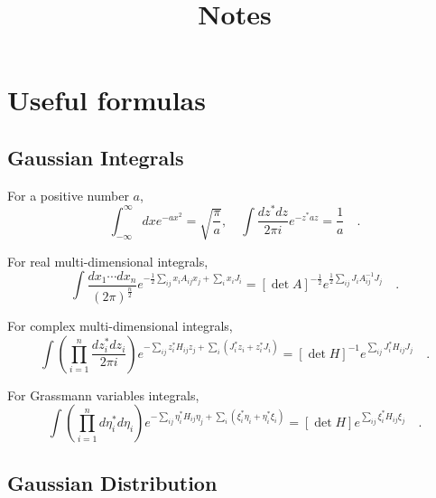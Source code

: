 \documentclass{book}
\title{Notes}
\date{}
\numberwithin{equation}{section}
\begin{document}
\tableofcontents

\chapter{Useful formulas}
\section{Gaussian Integrals}
For a positive number $a$,
\begin{equation}
  \int_{-\infty}^\infty dx e^{-ax^2}=\sqrt{\frac{\pi}{a}},\quad
  \int\frac{dz^*dz}{2\pi i}e^{-z^*az}=\frac{1}{a}\quad.
\end{equation}

For real multi-dimensional integrals,
\begin{equation}
  \int\frac{dx_1\cdots dx_n}{(2\pi)^{\frac{n}{2}}}
  e^{-\frac{1}{2}\sum_{ij}x_iA_{ij}x_j+\sum_ix_iJ_i}=
  [\det A]^{-\frac{1}{2}}e^{\frac{1}{2}\sum_{ij}J_iA^{-1}_{ij}J_j}\quad.
\end{equation}

For complex multi-dimensional integrals,
\begin{equation}
  \int\left(\prod_{i=1}^n\frac{dz_i^*dz_i}{2\pi i}\right)
  e^{-\sum_{ij}z_i^*H_{ij}z_j+\sum_i(J^*_iz_i+z_i^*J_i)}=
  [\det H]^{-1}e^{\sum_{ij}J_i^*H_{ij}J_j}\quad.
\end{equation}

For Grassmann variables integrals,
\begin{equation}
  \int\left(\prod_{i=1}^n d\eta_i^*d\eta_i\right)
  e^{-\sum_{ij}\eta_i^*H_{ij}\eta_j+\sum_i(\xi_i^*\eta_i+\eta_i^*\xi_i)}
  =[\det H]e^{\sum_{ij}\xi_i^*H_{ij}\xi_j}\quad.
\end{equation}

\section{Gaussian Distribution}
\end{document}
